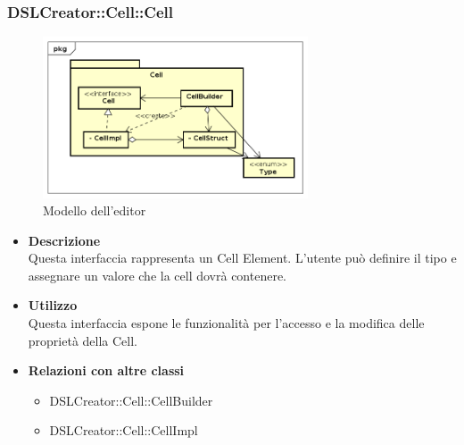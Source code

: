  \subsubsection{DSLCreator::Cell::Cell}
                 \begin{figure}[H]
                  \centering
                  \includegraphics[width=0.7\textwidth]{res/img/Cell.png}
                  \caption{Modello dell'editor}
                  \label{fig:diagram_model}
                \end{figure}
                    \begin{itemize}
                        \item \textbf{Descrizione} \hfill \\
                            Questa interfaccia rappresenta un Cell Element. L'utente può definire il tipo e assegnare un valore che la cell dovrà contenere.
                        \item \textbf{Utilizzo} \hfill \\
                            Questa interfaccia espone le funzionalità per l'accesso e la modifica delle proprietà della Cell.
                        \item \textbf{Relazioni con altre classi}
                            \begin{itemize}
                              \item DSLCreator::Cell::CellBuilder
                              \item DSLCreator::Cell::CellImpl
                            \end{itemize}
                    \end{itemize}

